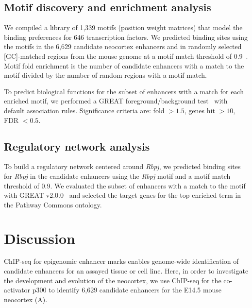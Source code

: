 \subsection{Motif discovery and enrichment analysis}
We compiled a library of 1,339 motifs (position weight matrices) that model the binding preferences for 646 transcription factors.  We predicted
binding sites using the motifs in the 6,629 candidate neocortex enhancers and in randomly selected [GC]-matched regions from the mouse genome at
a motif match threshold of 0.9~\citep{Kel2003}.  Motif fold enrichment is the number of candidate enhancers with a match to the motif divided
by the number of random regions with a motif match.

To predict biological functions for the subset of enhancers with a match for each enriched motif, we performed a GREAT foreground/background
test~\citep{McLean2010} with default association rules.  Significance criteria are:
fold $ > 1.5$, genes hit $ > 10$, FDR $ < 0.5$.

\subsection{Regulatory network analysis}
To build a regulatory network centered around \textit{Rbpj}, we predicted binding sites for \textit{Rbpj} in the candidate enhancers using the \textit{Rbpj} motif and a motif
match threshold of 0.9.  We evaluated the subset of enhancers with a match to the motif with GREAT v2.0.0~\citep{McLean2010} and selected the target
genes for the top enriched term in the Pathway Commons ontology.

\section{Discussion}
ChIP-seq for epigenomic enhancer marks enables genome-wide identification of candidate enhancers for an assayed tissue or cell line.
Here, in order to investigate the development and evolution of the neocortex, we use ChIP-seq for the co-activator p300 to identify 6,629 candidate
enhancers for the E14.5 mouse neocortex (A).

